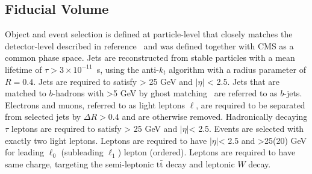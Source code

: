 
\subsection{Fiducial Volume}
\label{sec:ttw_fid}
Object and event selection is defined at particle-level that closely matches the detector-level described in reference~\cite{ATLAS-CONF-2019-045} and was defined together with CMS as a common phase space. 
Jets are reconstructed from stable particles with a mean lifetime of $\tau > 3\times 10^{-11}$~s, using the anti-$k_t$ algorithm with a radius parameter of $R=0.4$.
Jets are required to satisfy \pt > 25 GeV and $|\eta|$ < 2.5.
Jets that are matched to $b$-hadrons with \pt>5 GeV by ghost matching~\cite{Cacciari:2008gn} are referred to as $b$-jets. 
Electrons and muons, referred to as light leptons $\ell$, are required to be separated from selected jets by $\Delta R>0.4$ and are otherwise removed. 
Hadronically decaying $\tau$ leptons are required to satisfy \pt> 25 GeV and $|\eta| $< 2.5.
Events are selected with exactly two light leptons.
Leptons are required to have $|\eta|$< 2.5 and \pt>25(20) GeV for leading $\ell_0$ (subleading $\ell_1$) lepton (\pt ordered). 
Leptons are required to have same charge, targeting the semi-leptonic $\mathrm{t\bar{t}}$ decay and leptonic $W$ decay.

